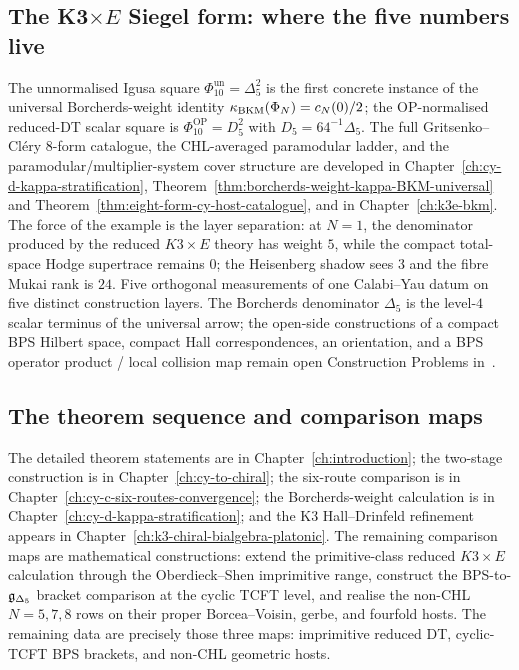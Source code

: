 \subsection*{The K3$\times E$ Siegel form: where the five numbers live}
\label{sec:preface-K3E-Siegel}

The unnormalised Igusa square \(\Phi_{10}^{\mathrm{un}}=\Delta_5^2\) is
the first concrete instance of the universal Borcherds-weight
identity $\kappa_{\mathrm{BKM}}(\Phi_N) = c_N(0)/2$; the OP-normalised reduced-DT
scalar square is \(\Phi_{10}^{\mathrm{OP}}=D_5^2\) with
\(D_5=64^{-1}\Delta_5\). The full Gritsenko--Cl\'ery $8$-form
catalogue, the CHL-averaged paramodular ladder, and the
paramodular/multiplier-system cover structure are developed in
Chapter~\ref{ch:cy-d-kappa-stratification},
Theorem~\ref{thm:borcherds-weight-kappa-BKM-universal} and
Theorem~\ref{thm:eight-form-cy-host-catalogue}, and in
Chapter~\ref{ch:k3e-bkm}. The force of the example is the layer
separation: at \(N=1\), the denominator produced by the reduced
\(K3\times E\) theory has weight \(5\), while the compact total-space
Hodge supertrace remains \(0\); the Heisenberg shadow sees \(3\) and
the fibre Mukai rank is \(24\). Five orthogonal measurements of one
Calabi--Yau datum on five distinct construction layers. The Borcherds
denominator \(\Delta_5\) is the level-$4$ scalar terminus of the
universal arrow; the open-side constructions of a compact BPS Hilbert
space, compact Hall correspondences, an orientation, and a BPS
operator product / local collision map remain open Construction
Problems in~\cite{LorgatIgusaCuspForm}.

\subsection*{The theorem sequence and comparison maps}
\label{wn:sec:platonic-preface-theorems-conjectures}

The detailed theorem statements are in Chapter~\ref{ch:introduction};
the two-stage construction is in Chapter~\ref{ch:cy-to-chiral}; the
six-route comparison is in Chapter~\ref{ch:cy-c-six-routes-convergence};
the Borcherds-weight calculation is in
Chapter~\ref{ch:cy-d-kappa-stratification}; and the K3 Hall--Drinfeld
refinement appears in Chapter~\ref{ch:k3-chiral-bialgebra-platonic}. The
remaining comparison maps are mathematical constructions: extend the
primitive-class reduced \(K3\times E\) calculation through the
Oberdieck--Shen imprimitive range, construct the
BPS-to-\(\mathfrak{g}_{\Delta_5}\) bracket comparison at the cyclic TCFT level,
and realise the non-CHL \(N=5,7,8\) rows on their proper
Borcea--Voisin, gerbe, and fourfold hosts. The remaining data are
precisely those three maps: imprimitive reduced DT, cyclic-TCFT BPS
brackets, and non-CHL geometric hosts.

